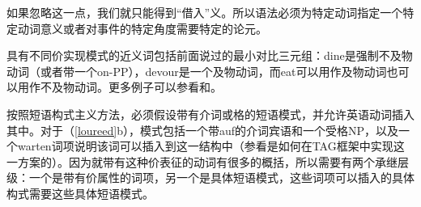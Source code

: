 \begin{exe}
\begin{xlist}[iv.]
\begin{exe}
\begin{xlist}[iv.]
\zl
如果忽略这一点，我们就只能得到“借入”义。所以语法必须为特定动词指定一个特定动词意义或者对事件的特定角度需要特定的论元。

具有不同价实现模式的近义词包括前面说过的最小对比三元组：dine是强制不及物动词（或者带一个on-PP），devour是一个及物动词，而eat可以用作及物动词也可以用作不及物动词\citep[--90]{Dowty89b-u}。更多例子可以参看\citet{Levin93a-u}和\citet{LRH2005a-u}。
%

按照短语构式主义方法，必须假设带有介词或格的短语模式，并允许英语动词插入其中。对于（\ref{loureed}b），模式包括一个带auf的介词宾语和一个受格NP，以及一个warten词项说明该词可以插入到这一结构中（参看是如何在TAG框架中实现这一方案的）。因为就带有这种价表征的动词有很多的概括，所以需要有两个承继层级：一个是带有价属性的词项，另一个是具体短语模式，这些词项可以插入的具体构式需要这些具体短语模式。


\end{xlist}
\end{exe}
\end{xlist}
\end{exe}

